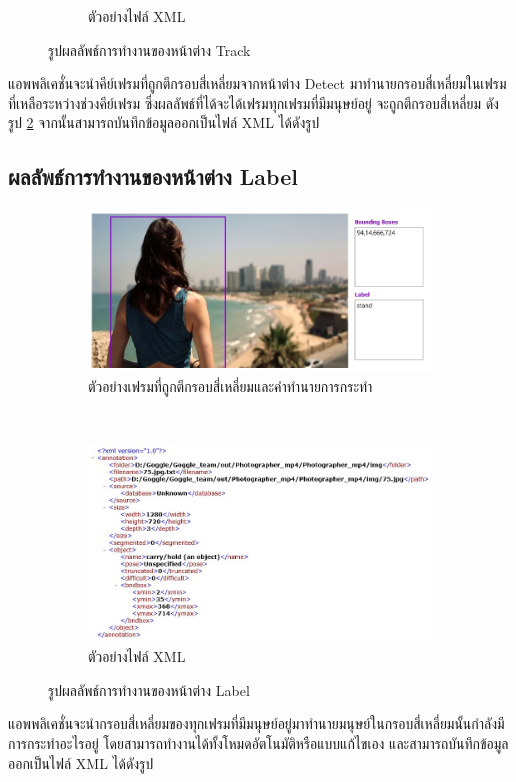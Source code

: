 \begin{figure}[!ht]
\begin{subfigure}[b]{0.7\linewidth}
      \caption{ตัวอย่างไฟล์ XML}
    \end{subfigure}
    \caption{รูปผลลัพธ์การทำงานของหน้าต่าง Track}
    \label{fig:result_track}
  \end{figure}
แอพพลิเคชั่นจะนำคีย์เฟรมที่ถูกตีกรอบสี่เหลี่ยมจากหน้าต่าง Detect มาทำนายกรอบสี่เหลี่ยมในเฟรมที่เหลือระหว่างช่วงคีย์เฟรม ซึ่งผลลัพธ์ที่ได้จะได้เฟรมทุกเฟรมที่มีมนุษย์อยู่ จะถูกตีกรอบสี่เหลี่ยม ดังรูป \ref{fig:result_track} จากนั้นสามารถบันทึกข้อมูลออกเป็นไฟล์ XML ได้ดังรูป

\clearpage
\subsection*{ผลลัพธ์การทำงานของหน้าต่าง Label}
\begin{figure}[!ht]
    \centering
   \begin{subfigure}[b]{0.65\linewidth}
      \includegraphics[width=\linewidth]{chapter4/images/Result/result_select.jpg}
      \caption{ตัวอย่างเฟรมที่ถูกตีกรอบสี่เหลี่ยมและคำทำนายการกระทำ}
    \end{subfigure}
\\
    \begin{subfigure}[b]{0.8\linewidth}
      \includegraphics[width=\linewidth]{chapter4/images/Result/result_select9.jpg}
      \caption{ตัวอย่างไฟล์ XML}
    \end{subfigure}
    \caption{รูปผลลัพธ์การทำงานของหน้าต่าง Label}
    \label{fig:result_track}
  \end{figure}
แอพพลิเคชั่นจะนำกรอบสี่เหลี่ยมของทุกเฟรมที่มีมนุษย์อยู่มาทำนายมนุษย์ในกรอบสี่เหลี่ยมนั้นกำลังมีการกระทำอะไรอยู่ โดยสามารถทำงานได้ทั้งโหมดอัตโนมัติหรือแบบแก้ไขเอง และสามารถบันทึกข้อมูลออกเป็นไฟล์ XML ได้ดังรูป
